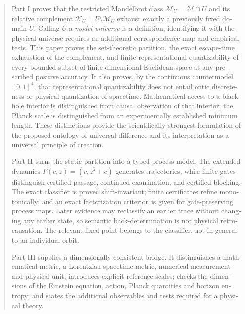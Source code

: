 \documentclass[11pt,a4paper]{article}
\theoremstyle{remark}
\newcommand{\M}{\mathcal{M}}
\newcommand{\K}{\mathcal{K}}
\begin{document}
\begin{otherlanguage}{english}
\begin{abstract}
Part I proves that the restricted Mandelbrot class \(\M_U=\M\cap U\) and its relative complement
\(\K_U=U\setminus\M_U\) exhaust exactly a previously fixed domain \(U\).
Calling \(U\) a \emph{model universe} is a
definition; identifying it with the physical universe requires an additional
correspondence map and empirical tests. This paper proves the set-theoretic
partition, the exact escape-time exhaustion of the complement, and finite
representational quantizability of every bounded subset of finite-dimensional
Euclidean space at any prescribed positive accuracy. It also proves, by the
continuous countermodel \([0,1]^4\), that representational quantizability does
not entail ontic discreteness or physical quantization of spacetime.
Mathematical access to a black-hole interior is distinguished from causal
observation of that interior; the Planck scale is distinguished from an
experimentally established minimum length. These distinctions provide the
scientifically strongest formulation of the proposed ontology of universal
difference and its interpretation as a universal principle of creation.

Part II turns the static partition into a typed process model. The extended
dynamics \(F(c,z)=(c,z^2+c)\) generates trajectories, while finite gates
distinguish certified passage, continued examination, and certified blocking.
The exact classifier is proved shift-invariant; finite certificates refine
monotonically; and an exact factorization criterion is given for gate-preserving
process maps. Later evidence may reclassify an earlier trace without changing
any earlier state, so semantic back-determination is not physical
retrocausation. The relevant fixed point belongs to the classifier, not in
general to an individual orbit.

Part III supplies a dimensionally consistent bridge. It distinguishes a
mathematical metric, a Lorentzian spacetime metric, numerical measurement and
physical unit; introduces explicit reference scales; checks the dimensions of
the Einstein equation, action, Planck quantities and horizon entropy; and
states the additional observables and tests required for a physical theory.


\end{abstract}
\end{otherlanguage}
\end{document}
